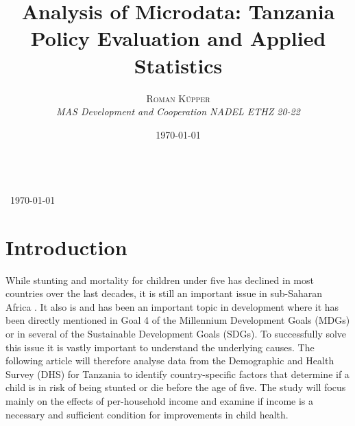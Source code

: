 \documentclass[a4paper, 11pt]{article} %
\title{\textbf{Analysis of Microdata: Tanzania}\\ %
Policy Evaluation and Applied Statistics } %
\author{\textsc{Roman Küpper} %
\\{\textit{MAS Development and Cooperation NADEL ETHZ 20-22}}} %
\date{\today} %
\makeatletter
\renewcommand{\maketitle}{ %
\begin{flushright} %
{\LARGE\@title} %
\vspace{50pt} %

{\large\@author} %
\\\ \today %

\vspace{40pt} %
\end{flushright}
}
\makeatother
\begin{document}
\maketitle %



\section{Introduction}
While stunting and mortality for children under five has declined in most countries over the last decades, it is still an important issue in sub-Saharan Africa \cite{Nshimyiryo2019Dec}. It also is and has been an important topic in development where it has been directly mentioned in Goal 4 of the Millennium Development Goals (MDGs) or in several of the Sustainable Development Goals (SDGs). To successfully solve this issue it is vastly important to understand the underlying causes. The following article will therefore analyse data from the Demographic and Health Survey (DHS) for Tanzania to identify country-specific factors that determine if a child is in risk of being stunted or die before the age of five. The study will focus mainly on the effects of per-household income and examine if income is a necessary and sufficient condition for improvements in child health.
\end{document}
